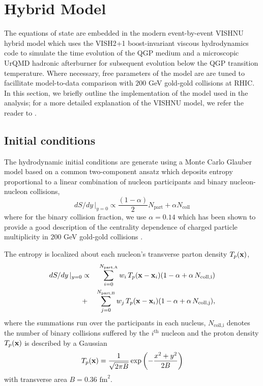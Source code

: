 \documentclass[aps,prc,reprint,amsmath,nofootinbib,superscriptaddress]{revtex4-1}
\begin{document}

\section{Hybrid Model}

The equations of state are embedded in the modern event-by-event VISHNU hybrid model which uses the VISH2+1 boost-invariant viscous hydrodynamics code to simulate the 
time evolution of the QGP medium and a microscopic UrQMD hadronic afterburner for subsequent evolution below the QGP transition temperature. Where necessary, free
parameters of the model are are tuned to facillitate model-to-data comparison with $200$ GeV gold-gold collisions at RHIC. In this section, we briefly outline
the implementation of the model used in the analysis; for a more detailed explanation of the VISHNU model, we refer the reader to \cite{}. 

\subsection{Initial conditions}
\label{initial_condition}

The hydrodynamic initial conditions are generate using a Monte Carlo Glauber model based on a common two-component ansatz which deposits entropy proportional to a linear combination 
of nucleon participants and binary nucleon-nucleon collisions,
\begin{equation}
 dS/dy \,\vert_{y=0} \propto \frac{(1-\alpha)}{2}N_\text{part} + \alpha N_\text{coll}
 \label{twocomponent}
\end{equation}
where for the binary collision fraction, we use $\alpha=0.14$ which has been shown to provide a good description of the centrality dependence of charged particle 
multiplicity in $200$ GeV gold-gold collisions \cite{?}.

The entropy is localized about each nucleon's transverse parton density $T_p({\bf x})$,
\begin{eqnarray}
 dS/dy \,\vert_{y=0} &\propto& \sum\limits_{i=0}^{N_\text{part,A}} w_i\, T_p({\bf x} - {\bf x}_i)(1-\alpha + \alpha\, N_\text{coll,i}) \nonumber \\
                     &+& \sum\limits_{j=0}^{N_\text{part,B}} w_j\, T_p({\bf x} - {\bf x}_i)(1-\alpha + \alpha\, N_\text{coll,j}),
 \label{glauber}
\end{eqnarray}
where the summations run over the participants in each nucleus, $N_\text{coll,i}$ denotes the number of binary collisions suffered by the $i^\text{th}$ nucleon 
and the proton density $T_p({\bf x})$ is described by a Gaussian
\begin{equation}
 T_p({\bf x}) = \frac{1}{\sqrt{2 \pi B}} \exp \left(-\frac{x^2+y^2}{2 B} \right)
\end{equation}
with transverse area $B = 0.36$ $\text{fm}^2$.
\end{document}
